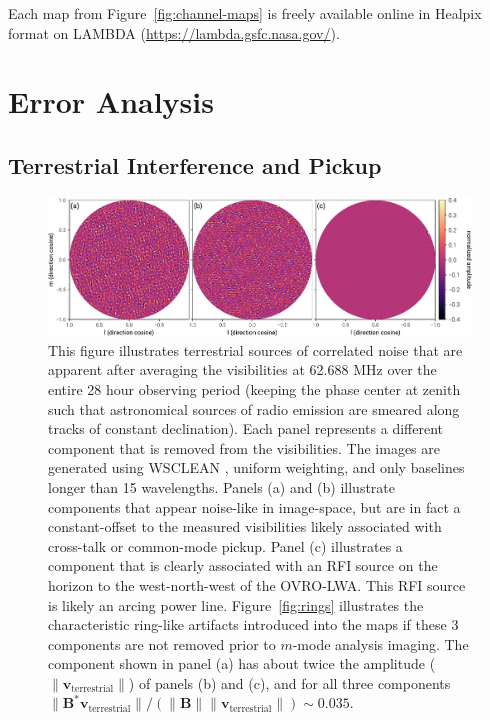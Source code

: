 \documentclass[twocolumn]{aastex61}
\renewcommand{\b}{\pmb}
\begin{document}
Each map from Figure~\ref{fig:channel-maps} is freely available online in Healpix format
\citep{2005ApJ...622..759G} on LAMBDA (\url{https://lambda.gsfc.nasa.gov/}).

\section{Error Analysis}\label{sec:error}

\subsection{Terrestrial Interference and Pickup}\label{sec:rfi}

\begin{figure}[t]
    \includegraphics[width=\textwidth]{figures/terrestrial-interference/smeared}
    \caption{
        This figure illustrates terrestrial sources of correlated noise that are apparent after
        averaging the visibilities at 62.688 MHz over the entire 28 hour observing period (keeping
        the phase center at zenith such that astronomical sources of radio emission are smeared
        along tracks of constant declination). Each panel represents a different component that is
        removed from the visibilities. The images are generated using WSCLEAN
        \citep{2014MNRAS.444..606O}, uniform weighting, and only baselines longer than 15
        wavelengths. Panels (a) and (b) illustrate components that appear noise-like in image-space,
        but are in fact a constant-offset to the measured visibilities likely associated with
        cross-talk or common-mode pickup. Panel (c) illustrates a component that is clearly
        associated with an RFI source on the horizon to the west-north-west of the OVRO-LWA. This
        RFI source is likely an arcing power line.  Figure~\ref{fig:rings} illustrates the
        characteristic ring-like artifacts introduced into the maps if these 3 components are not
        removed prior to $m$-mode analysis imaging. The component shown in panel (a) has about twice
        the amplitude ($\|\b v_\text{terrestrial}\|$) of panels (b) and (c), and for all three
        components $\|\b B^*\b v_\text{terrestrial}\|/(\|\b B\|\|\b v_\text{terrestrial}\|) \sim
        0.035$.
    }
    \label{fig:fitrfi}
\end{figure}
\end{document}
